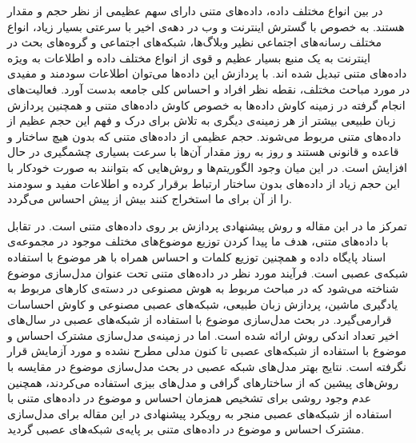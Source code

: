 \documentclass[12pt,a4paper]{article}
\begin{document}
در بین انواع مختلف داده، داده‌های متنی دارای سهم عظیمی‌ از نظر حجم و مقدار هستند. به خصوص با گسترش اینترنت  و وب در دهه‌ی اخیر با سرعتی‌ بسیار زیاد، انواع مختلف رسانه‌های اجتماعی نظیر وبلاگ‌ها، شبکه‌های اجتماعی و گروه‌های بحث در اینترنت به یک منبع بسیار عظیم و قوی از انواع مختلف داده و اطلاعات به  ویژه داده‌‌های  متنی تبدیل شده اند. با پردازش این داده‌ها می‌‌توان اطلاعات سودمند و مفیدی در مورد مباحث مختلف، نقطه نظر افراد و احساس کلی‌ جامعه بدست آورد.
 فعالیت‌های انجام گرفته در زمینه کاوش داده‌ها به خصوص کاوش داده‌های متنی و همچنین پردازش زبان طبیعی بیشتر از هر زمینه‌ی دیگری به تلاش برای درک و فهم این حجم عظیم از داده‌های متنی مربوط می‌‌شوند. حجم عظیمی از داده‌های متنی که بدون هیچ ساختار و قاعده و قانونی‌ هستند و روز به روز مقدار آن‌ها با سرعت بسیاری چشمگیری در حال افزایش است. در این میان وجود الگوریتم‌ها و روش‌هایی که بتوانند به صورت خودکار با این حجم زیاد از داده‌های بدون ساختار ارتباط برقرار کرده و اطلاعات مفید و سودمند را از آن برای ما استخراج کنند بیش از پیش احساس می‌‌گردد.

تمرکز ما در ابن مقاله و روش پیشنهادی پردازش بر روی داده‌های متنی است. در تقابل با داده‌های متنی، هدف ما پیدا کردن توزیع موضوع‌های مختلف موجود در مجموعه‌ی اسناد پایگاه داده و همچنین توزیع کلمات و احساس همراه با هر موضوع با استفاده شبکه‌ی عصبی است. فرآیند مورد نظر در داده‌های متنی تحت عنوان مدل‌سازی موضوع شناخته می‌‌شود که در مباحث مربوط به هوش مصنوعی در دسته‌ی کارهای مربوط به یادگیری ماشین، پردازش زبان طبیعی، شبکه‌های عصبی مصنوعی و کاوش احساسات قرارمی‌‌گیرد. در بحث مدل‌سازی موضوع با استفاده از شبکه‌های عصبی در سال‌های اخیر تعداد اندکی‌ روش ارائه شده است. اما در زمینه‌‌ی مدل‌سازی مشترک احساس و موضوع با استفاده از شبکه‌های عصبی تا کنون مدلی‌ مطرح نشده و مورد آزمایش قرار نگرفته است. نتایج بهتر مدل‌های شبکه عصبی در بحث مدل‌سازی موضوع در مقایسه با روش‌های پیشین که از ساختارهای گرافی‌ و مدل‌های بیزی استفاده می‌‌کردند، همچنین عدم وجود روشی‌ برای تشخیص همزمان احساس و موضوع در داده‌های متنی با استفاده از شبکه‌های عصبی منجر به رویکرد پیشنهادی در این مقاله برای مدل‌سازی مشترک احساس و موضوع در داده‌های متنی بر پایه‌ی شبکه‌های عصبی گردید.
\end{document}
